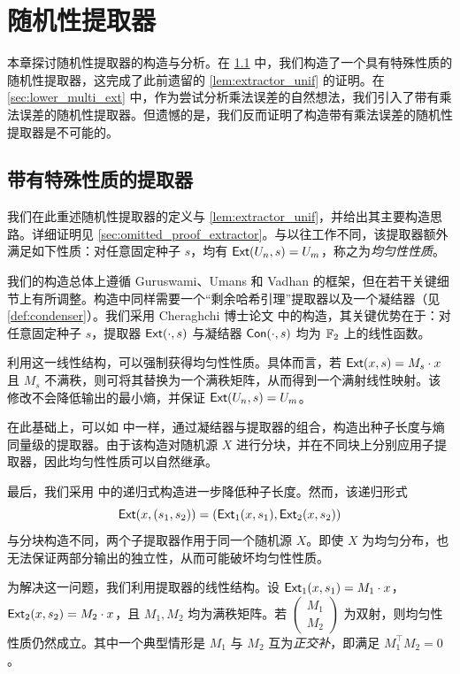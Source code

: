 \section{随机性提取器}\label{sec:extractor}

本章探讨随机性提取器的构造与分析。在 \ref{sec:extractor_special} 中，我们构造了一个具有特殊性质的随机性提取器，这完成了此前遗留的 \cref{lem:extractor_unif} 的证明。在 \ref{sec:lower_multi_ext} 中，作为尝试分析乘法误差的自然想法，我们引入了带有乘法误差的随机性提取器。但遗憾的是，我们反而证明了构造带有乘法误差的随机性提取器是不可能的。

\subsection{带有特殊性质的提取器}\label{sec:extractor_special}

我们在此重述随机性提取器的定义与 \cref{lem:extractor_unif}，并给出其主要构造思路。详细证明见 \ref{sec:omitted_proof_extractor}。与以往工作不同，该提取器额外满足如下性质：对任意固定种子 $s$，均有 $\mathsf{Ext}(U_n, s) = U_m$，称之为\emph{均匀性性质}。

\Extractor*

\ExtractorUniform*

我们的构造总体上遵循 Guruswami、Umans 和 Vadhan \cite{GUV_extractor} 的框架，但在若干关键细节上有所调整。构造中同样需要一个“剩余哈希引理”提取器以及一个凝结器（见 \cref{def:condenser}）。我们采用 Cheraghchi 博士论文 \cite{Cheraghchi11_phd_thesis} 中的构造，其关键优势在于：对任意固定种子 $s$，提取器 $\mathsf{Ext}(\cdot, s)$ 与凝结器 $\mathsf{Con}(\cdot, s)$ 均为 $\mathbb{F}_2$ 上的线性函数。

利用这一线性结构，可以强制获得均匀性性质。具体而言，若 $\mathsf{Ext}(x, s) = M_s \cdot x$ 且 $M_s$ 不满秩，则可将其替换为一个满秩矩阵，从而得到一个满射线性映射。该修改不会降低输出的最小熵，并保证 $\mathsf{Ext}(U_n, s) = U_m$。

在此基础上，可以如 \cite{GUV_extractor} 中一样，通过凝结器与提取器的组合，构造出种子长度与熵同量级的提取器。由于该构造对随机源 $X$ 进行分块，并在不同块上分别应用子提取器，因此均匀性性质可以自然继承。

最后，我们采用 \cite{GUV_extractor} 中的递归式构造进一步降低种子长度。然而，该递归形式
$$
\mathsf{Ext}(x, (s_1, s_2)) = (\mathsf{Ext}_1(x, s_1), \mathsf{Ext}_2(x, s_2))
$$
与分块构造不同，两个子提取器作用于同一个随机源 $X$。即使 $X$ 为均匀分布，也无法保证两部分输出的独立性，从而可能破坏均匀性性质。

为解决这一问题，我们利用提取器的线性结构。设 $\mathsf{Ext}_1(x, s_1) = M_1 \cdot x$，$\mathsf{Ext}_2(x, s_2) = M_2 \cdot x$，且 $M_1, M_2$ 均为满秩矩阵。若 $\begin{pmatrix} M_1 \\ M_2 \end{pmatrix}$ 为双射，则均匀性性质仍然成立。其中一个典型情形是 $M_1$ 与 $M_2$ 互为\emph{正交补}，即满足 $M_1^\top M_2 = 0$。

